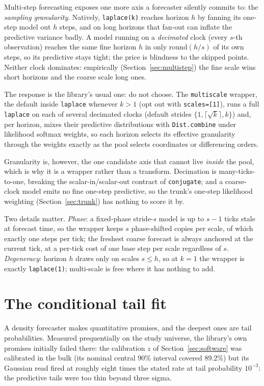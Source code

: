 \documentclass[article]{jss}
\providecommand{\code}[1]{\texttt{#1}}
\begin{document}
Multi-step forecasting exposes one more axis a forecaster silently commits to:
the \emph{sampling granularity}. Natively, \code{laplace(k)} reaches horizon $h$
by fanning its one-step model out $h$ steps, and on long horizons that fan-out
can inflate the predictive variance badly. A model running on a \emph{decimated}
clock (every $s$-th observation) reaches the same fine horizon $h$ in only
$\mathrm{round}(h/s)$ of its own steps, so its predictive stays tight; the price
is blindness to the skipped points. Neither clock dominates: empirically
(Section~\ref{sec:multistep}) the fine scale wins short horizons and the coarse
scale long ones.

The response is the library's usual one: do not choose. The
\code{multiscale} wrapper, the default inside \code{laplace} whenever $k>1$
(opt out with \code{scales=[1]}), runs a full
\code{laplace} on each of several decimated clocks (default strides $\{1,
\lceil\sqrt{k}\rceil, k\}$) and, per horizon, mixes their predictive
distributions with \code{Dist.combine} under likelihood softmax weights, so each
horizon selects its effective granularity through the weights exactly as the
pool selects coordinates or differencing orders.

Granularity is, however, the one candidate axis that cannot live \emph{inside}
the pool, which is why it is a wrapper rather than a transform. Decimation is
many-ticks-to-one, breaking the scalar-in/scalar-out contract of
\code{conjugate}; and a coarse-clock model emits no fine one-step predictive,
so the trunk's one-step likelihood weighting (Section~\ref{sec:trunk}) has
nothing to score it by.

Two details matter. \emph{Phase}: a fixed-phase stride-$s$
model is up to $s-1$ ticks stale at forecast time, so the wrapper keeps $s$
phase-shifted copies per scale, of which exactly one steps per tick; the
freshest coarse forecast is always anchored at the current tick, at a per-tick
cost of one base step per scale regardless of $s$. \emph{Degeneracy}: horizon
$h$ draws only on scales $s \le h$, so at $k=1$ the wrapper is exactly
\code{laplace(1)}; multi-scale is free where it has nothing to add.

\section{The conditional tail fit} \label{sec:tails}

A density forecaster makes quantitative promises, and the deepest ones are
tail probabilities. Measured prequentially on the study universe, the
library's own promises initially failed there: the calibration $z$ of
Section~\ref{sec:software} was calibrated in the bulk (its nominal central 90\%
interval covered 89.2\%) but its Gaussian read fired at roughly eight times
the stated rate at tail probability $10^{-3}$: the predictive tails were
too thin beyond three sigma.
\end{document}
